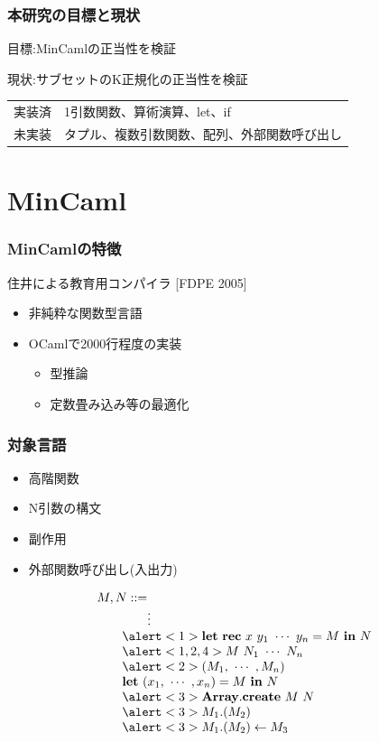 \documentclass[dvipdfmx,cjk,xcolor=dvipsnames,envcountsect,notheorems,12pt]{beamer}
\theoremstyle{definition}
\newcommand{\keyword}[1]{\mathbf{#1}}
\newcommand{\LET}{\keyword{let}}
\newcommand{\REC}{\keyword{rec}}
\newcommand{\ARRAY}{\keyword{Array}}
\newcommand{\CREATE}{\keyword{create}}
\newcommand{\IN}{\keyword{in}}
\begin{document}
\begin{frame}
	\frametitle{本研究の目標と現状}
	\Large 目標:MinCamlの正当性を検証

	\vfill

	現状:サブセットのK正規化の正当性を検証
	\begin{center}
		\normalsize
		\begin{tabular}{ll}
			実装済 & 1引数関数、算術演算、let、if \\
			未実装 & タプル、複数引数関数、配列、外部関数呼び出し \\
		\end{tabular}
	\end{center}
\end{frame}

\section{MinCaml}

\begin{frame}
	\frametitle{MinCamlの特徴}
	\Large 住井による教育用コンパイラ [FDPE 2005]
	\begin{itemize}
		\item 非純粋な関数型言語
		\item OCamlで2000行程度の実装
			\begin{itemize}
				\item 型推論
				\item 定数畳み込み等の最適化
			\end{itemize}
	\end{itemize}
\end{frame}

\begin{frame}
	\frametitle{対象言語}
	\Large
	\begin{itemize}
		\item \alert<1>{高階関数}
		\item \alert<2>{N引数の構文}
		\item \alert<3>{副作用}
		\item \alert<4>{外部関数呼び出し(入出力)}
	\end{itemize}
	{\normalsize
	\[
	\begin{array}{l}
		M, N ::= \\
		\qquad \qquad \vdots\\
		\qquad \alert<1>{\LET~\REC~x~y_1~\cdots~y_n=M~\IN~N}\\
		\qquad \alert<1,2,4>{M~N_1~\cdots~N_n}\\
		\qquad \alert<2>{(M_1,~\cdots~,M_n)}\\
		\qquad \LET~(x_1,~\cdots~,x_n)=M~\IN~N\\
		\qquad \alert<3>{\ARRAY.\CREATE~M~N}\\
		\qquad \alert<3>{M_1.(M_2)}\\
		\qquad \alert<3>{M_1.(M_2)\leftarrow M_3}\\
	\end{array}
	\]}
	\pause
	\pause
	\pause
\end{frame}
\end{document}
